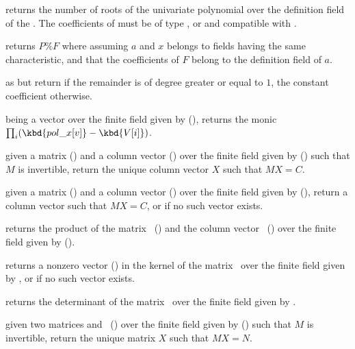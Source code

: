  returns the number of roots
of the univariate polynomial  over the definition field of the
 . The coefficients of  must be of type ,
 or  and compatible with .

 returns $P\%F$
where  assuming $a$ and $x$ belongs to fields having the same
characteristic, and that the coefficients of $F$ belong to the definition
field of $a$.

 as 
but return  if the remainder is of degree greater or equal to $1$,
the constant coefficient otherwise.

 being a vector over the finite field given by  (),
returns the monic  $\prod_i (\kbd{pol\_x[v]} - \kbd{V[i]})$.


 given a matrix 
() and a column vector  () over the finite
field given by  () such that $M$ is invertible,
return the unique column vector $X$ such that $MX=C$.

 given a matrix
 () and a column vector  () over the
finite field given by  (), return a column vector
 such that $MX=C$, or  if no such vector exists.

 returns the product of
the matrix~ () and the column vector~
() over the finite field given by  ().

 returns a nonzero vector
() in the kernel of the matrix~ over the finite field
given by , or  if no such vector exists.

 returns the determinant of the
matrix~ over the finite field given by .

 given two matrices 
and~ () over the finite field given by 
() such that $M$ is invertible, return the unique matrix
$X$ such that $MX=N$.


